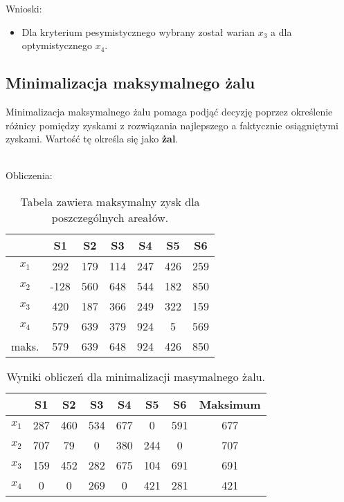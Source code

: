 \documentclass{article}
\begin{document}
Wnioski:

\begin{itemize}
  \item Dla kryterium pesymistycznego wybrany został warian $x_3$ a dla optymistycznego $x_4$.
\end{itemize}

\subsection{Minimalizacja maksymalnego żalu}

Minimalizacja maksymalnego żalu pomaga podjąć decyzję poprzez określenie różnicy pomiędzy zyskami z rozwiązania najlepszego a faktycznie osiągniętymi zyskami.
Wartość tę określa się jako \textbf{żal}.

\\
Obliczenia:


\begin{table}[H]
  \begin{center}
    \begin{tabular}{ c |  c  c   c   c   c   c  }
      & S1 & S2 & S3 & S4 & S5 & S6 \\
      \hline
      $x_1$ & 292 & 179 & 114 & 247 & 426 & 259 \\
      $x_2$ & -128 & 560 & 648 & 544 & 182 & 850 \\
      $x_3$ & 420 & 187 & 366 & 249 & 322 & 159 \\
      $x_4$ & 579 & 639 & 379 & 924 & 5 & 569 \\
      \hline
      maks. & 579 & 639 & 648 & 924 & 426 & 850 \\
    \end{tabular} 
    \caption{\label{table:areals} Tabela zawiera maksymalny zysk dla poszczególnych areałów.}
  \end{center}
\end{table}

\begin{table}[H]
  \begin{center}
    \begin{tabular}{ c |  c  c   c   c   c   c | c  }
      & S1 & S2 & S3 & S4 & S5 & S6 & Maksimum \\
      \hline
      $x_1$ & 287 & 460 & 534 & 677 & 0   & 591 & 677 \\
      $x_2$ & 707 & 79  & 0   & 380 & 244 & 0   & 707 \\
      $x_3$ & 159 & 452 & 282 & 675 & 104 & 691 & 691 \\
      $x_4$ & 0   & 0   & 269 & 0   & 421 & 281 & \cellcolor{green!25}421 \\
      \hline
    \end{tabular} 
    \caption{\label{table:zal} Wyniki obliczeń dla minimalizacji masymalnego żalu. }
  \end{center}
\end{table}
\end{document}
